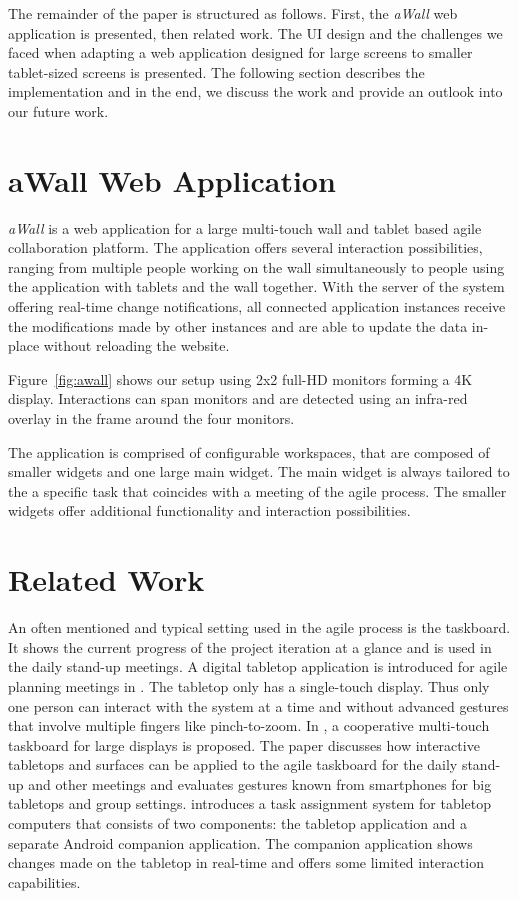\documentclass{sigchi}
\begin{document}
The remainder of the paper is structured as follows.
First, the \textit{aWall} web application is presented, then related work.
The UI design and the challenges we faced when adapting a web application designed for large screens to smaller tablet-sized screens is presented.
The following section describes the implementation and in the end, we discuss the work and provide an outlook into our future work.


\section{aWall Web Application}

\textit{aWall} is a web application for a large multi-touch wall and tablet based agile collaboration platform.
The application offers several interaction possibilities, ranging from multiple people working on the wall simultaneously to people using the application with tablets and the wall together.
With the server of the system offering real-time change notifications, all connected application instances receive the modifications made by other instances and are able to update the data in-place without reloading the website.

Figure~\ref{fig:awall} shows our setup using 2x2 full-HD monitors forming a 4K display.
Interactions can span monitors and are detected using an infra-red overlay in the frame around the four monitors.

The application is comprised of configurable workspaces, that are composed of smaller widgets and one large main widget.
The main widget is always tailored to the a specific task that coincides with a meeting of the agile process.
The smaller widgets offer additional functionality and interaction possibilities.


\section{Related Work}
An often mentioned and typical setting used in the agile process is the taskboard.
It shows the current progress of the project iteration at a glance and is used in the daily stand-up meetings. 
A digital tabletop application is introduced for agile planning meetings in \cite{Ghanam:4599452}. 
The tabletop only has a single-touch display. 
Thus only one person can interact with the system at a time and without advanced gestures that involve multiple fingers like pinch-to-zoom.
In \cite{Rubart:2014:CMS:2669485.2669551}, a cooperative multi-touch taskboard for large displays is proposed. 
The paper discusses how interactive tabletops and surfaces can be applied to the agile taskboard for the daily stand-up and other meetings and evaluates gestures known from smartphones for big tabletops and group settings.
\cite{Haas:2014:TAV:2669485.2669538} introduces a task assignment system for tabletop computers that consists of two components: the tabletop application and a separate Android companion application.
The companion application shows changes made on the tabletop in real-time and offers some limited interaction capabilities.
\end{document}
